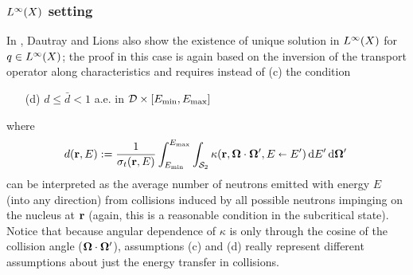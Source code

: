 \subsubsection{$\Lp[\infty](X)$ setting}
In \cite[Chap. XXI, \S 2, Proposition 6]{DautrayLions}, Dautray and Lions also 
show the existence of unique solution in $\Lp[\infty](X)$ for $q\in \Lp[\infty](X)$; the proof in this case is again
based on the inversion of the transport operator along characteristics and requires instead of
 (c) the condition
\begin{enumerate}
  \item[(d)] $d \leq \bar d < 1$ a.e. in $\VV\times[\Emin,\Emax]$
\end{enumerate}
where
\begin{equation}\label{eq:d} 
d(\br,E) := 
  \frac{1}{\sigma_t(\br,E)}\int_{\Emin}^{\Emax}\int_{\Sphere} \kappa(\br,\bomega\cdot\bomega',
	    E\sla E')\,\d{E'}\d{\bomega'}
\end{equation}
can be interpreted as the average number of neutrons emitted with energy $E$ (into any direction) from
collisions induced by all possible neutrons impinging on the nucleus at $\br$ (again, this is a reasonable condition
in the subcritical state). Notice that because angular dependence of $\kappa$ is only through the cosine of the
collision angle ($\bomega\cdot\bomega'$), assumptions (c) and (d) really represent different assumptions about just the energy
transfer in collisions. 

